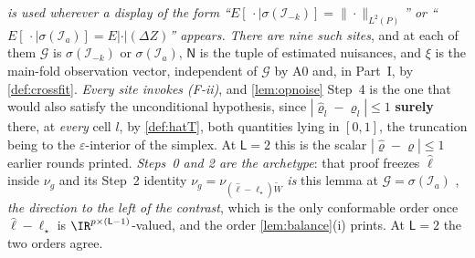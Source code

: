 \begin{remark}\label{rem:pfreezesites}
\emph{ is used wherever a display of the form
``$E[\,\cdot\mid\sigma(\mathcal I_{-k})]=\|\cdot\|_{L^{2}(P)}$'' or
``$E[\,\cdot\mid\sigma(\mathcal I_a)]=E|\cdot|(\Delta Z)$'' appears. There are nine such sites}, and at
each of them $\mathcal G$ is $\sigma(\mathcal I_{-k})$ or $\sigma(\mathcal I_a)$, $\mathsf N$ is the tuple of
estimated nuisances, and $\xi$ is the main-fold observation vector, independent of $\mathcal G$ by A0 and,
in Part~I, by \cref{def:crossfit}. \emph{Every site invokes \textup{(F-ii)}}, and
\cref{lem:opnoise} Step~4 is the one that would also satisfy the unconditional hypothesis, since
$|\hat\varrho_l-\varrho_l|\le1$ \textbf{surely} there, at \emph{every} cell $l$, by \cref{def:hatT}, 
both quantities lying in $[0,1]$, the truncation being to the $\varepsilon$-interior of the simplex.
At $\mathsf L=2$ this is the scalar $|\hat\varrho-\varrho|\le1$ earlier rounds printed.
\emph{
Steps~0 and 2 are the archetype}: that
proof freezes $\hat\ell$ inside $\nu_g$ and its Step~2 identity
$\nu_g=\nu_{(\hat\ell-\ell_\star)\widetilde W}$ \emph{is} this lemma at $\mathcal G=\sigma(\mathcal I_a)$
, \emph{the direction to the left of the contrast}, which is the only conformable order once
$\hat\ell-\ell_\star$ is $\IR^{p\times(\mathsf L-1)}$-valued, and the order
\cref{lem:balance}\textup{(i)} prints. At $\mathsf L=2$ the two orders agree.


\end{remark}
